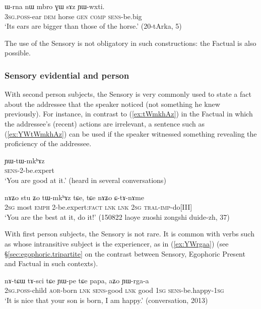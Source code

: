 \begin{exe}
\ex \label{ex:sAz.YWwxti}
\gll ɯ-rna nɯ mbro ɣɯ sɤz ɲɯ-wxti. \\
\textsc{3sg}.\textsc{poss}-ear \textsc{dem} horse \textsc{gen} \textsc{comp} \textsc{sens}-be.big \\
\glt `Its ears are bigger than those of the horse.'  (20-tArka, 5)
\end{exe}

The use of the Sensory is not obligatory in such constructions: the Factual is also possible. 

\subsubsection{Sensory evidential and person} \label{sec:sensory.person}
With second person subjects, the Sensory is very commonly used to state a fact about the addressee that the speaker noticed (not something he knew previously). For instance, in contrast to (\ref{ex:tWmkhAz}) in the Factual in which the addressee's (recent) actions are irrelevant, a sentence such as (\ref{ex:YWtWmkhAz}) can be used if the speaker witnessed something revealing the proficiency of the addressee.

\begin{exe}
\ex \label{ex:YWtWmkhAz}
\gll  ɲɯ-tɯ-mkʰɤz \\
\textsc{sens}-2-be.expert \\
\glt `You are good at it.' (heard in several conversations)
\end{exe}

\begin{exe}
\ex \label{ex:tWmkhAz}
\gll nɤʑo stu ʑo tɯ-mkʰɤz tɕe, tɕe nɤʑo ɕ-tɤ-nɤme \\
\textsc{2sg} most \textsc{emph} 2-be.expert:\textsc{fact}   \textsc{lnk} \textsc{lnk} \textsc{2sg} \textsc{tral}-\textsc{imp}-do[III] \\
\glt `You are the best at it, do it!' (150822 laoye zuoshi zongshi duide-zh, 37)
\end{exe}


With first person subjects, the Sensory is not rare. It is common with verbs such as  whose intransitive subject is the experiencer, as in (\ref{ex:YWrgaa}) (see §\ref{sec:egophoric.tripartite} on the contrast between Sensory, Egophoric Present and Factual in such contexts).

\begin{exe}
\ex \label{ex:YWrgaa}
\gll nɤ-tɕɯ tɤ-sci tɕe ɲɯ-pe tɕe papa, aʑo ɲɯ-rga-a\\
 \textsc{2sg}.\textsc{poss}-child \textsc{aor}-born \textsc{lnk} \textsc{sens}-good \textsc{lnk} good  \textsc{1sg} \textsc{sens}-be.happy-\textsc{1sg}\\
\glt `It is nice that your son is born, I am happy.' (conversation, 2013)
\end{exe}


